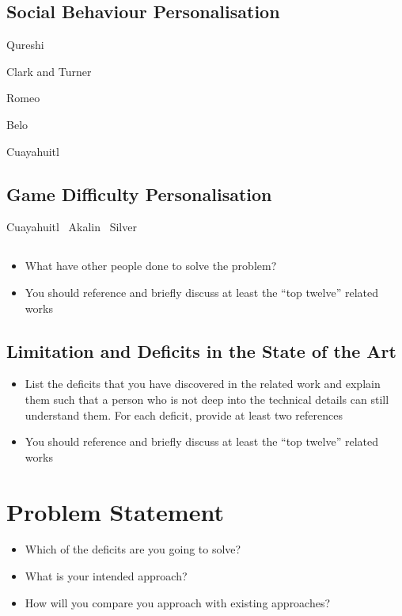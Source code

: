 \documentclass[thesis]{mas_proposal}
\begin{document}
\subsection{Social Behaviour Personalisation}

Qureshi~\cite{Qureshi2016,Qureshi2017,Qureshi2018}

Clark and Turner~\cite{ClarkTurner2017,Turner2018}

Romeo~\cite{Romeo2018,Romeo2019,romeo2021human}

Belo~\cite{Belo2021,Belo2022}

Cuayahuitl~\cite{Cuayahuitl2017}

\subsection{Game Difficulty Personalisation}

Cuayahuitl~\cite{Cuayahuitl2020}
Akalin~\cite{Akalin2018}
Silver~\cite{Silver2016}

\subsection{}
\begin{itemize}
    \item What have other people done to solve the problem?
    \item You should reference and briefly discuss at least the ``top twelve'' related works
\end{itemize}

\subsection{Limitation and Deficits in the State of the Art}
\begin{itemize}
    \item List the deficits that you have discovered in the related work and explain them such that a person who is not deep into the technical details can still understand them.
    For each deficit, provide at least two references
    \item You should reference and briefly discuss at least the ``top twelve'' related works
\end{itemize}

\section{Problem Statement}
\begin{itemize}
    \item Which of the deficits are you going to solve?
    \item What is your intended approach?
    \item How will you compare you approach with existing approaches?
\end{itemize}
\end{document}

